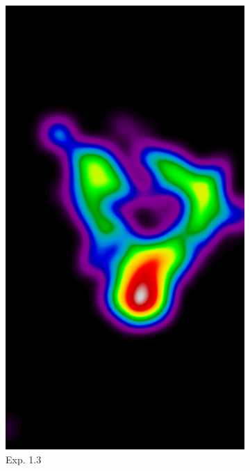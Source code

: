 \documentclass{beamer}
\begin{document}
\begin{frame}
\begin{figure}
\begin{subfigure}{0.134\textwidth}
		            \includegraphics[width=\textwidth]{plots/examples/example5_probs_1_3.png}
	            \caption*{\footnotesize Exp. 1.3}
            \end{subfigure}
            \begin{subfigure}{0.134\textwidth}
	            \centering

\end{subfigure}
\end{figure}
\end{frame}
\end{document}
